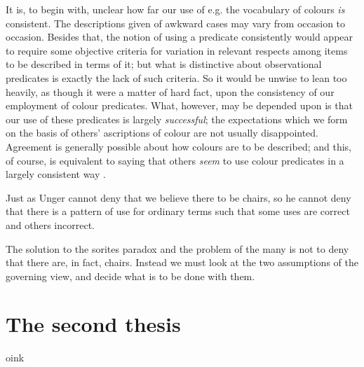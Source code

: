 \documentclass[11pt]{article}
\newenvironment{squote}{%
\begin{spacing}{1}
       	\begin{list}{}{%
\setlength{\labelwidth}{0pt}%
\rightmargin\leftmargin%
}
\item\relax
}{%
\end{list}%
\end{spacing}
}
\begin{document}
\begin{spacing}{1.5}
\begin{squote}
It is, to begin with, unclear how far our use of e.g. the vocabulary
  of colours \emph{is} consistent.  The descriptions given of awkward cases
  may vary from occasion to occasion.  Besides that, the notion of
  using a predicate consistently would appear to require some
  objective criteria for variation in relevant respects among items to
  be described in terms of it; but what is distinctive about
  observational predicates is exactly the lack of such criteria.  So
  it would be unwise to lean too heavily, as though it were a matter
  of hard fact, upon the consistency of our employment of colour
  predicates.  What, however, may be depended upon is that our use of
  these predicates is largely \emph{successful}; the expectations which we
  form on the basis of others' ascriptions of colour are not usually
  disappointed.  Agreement is generally possible about how colours are
  to be described; and this, of course, is equivalent to saying that
  others \emph{seem} to use colour predicates in a largely consistent way
  \citep[361]{wright1975}.
\end{squote}

Just as Unger cannot deny that we believe there to be chairs, so he
cannot deny that there is a pattern of use for ordinary terms such
that some uses are correct and others incorrect.

The solution to the sorites paradox and the problem of the many is not
to deny that there are, in fact, chairs.  Instead we must look at the
two assumptions of the governing view, and decide what is to be done
with them.

\section{The second thesis}
oink

\ifstandalone
\end{spacing}


\fi
\end{document}
